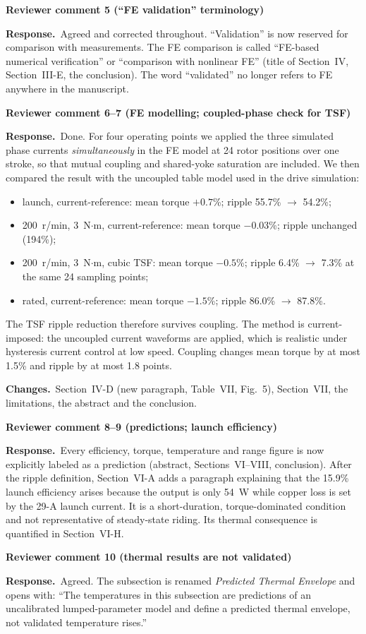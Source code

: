 \documentclass[10pt]{article}
\newcommand{\rev}[1]{\par\medskip\noindent\textbf{Reviewer comment #1}\par}
\newcommand{\resp}{\par\noindent\textcolor{blue!50!black}{\textbf{Response.}}~}
\newcommand{\chg}{\par\noindent\textcolor{green!35!black}{\textbf{Changes.}}~}
\begin{document}
\rev{5 (``FE validation'' terminology)}
\resp Agreed and corrected throughout. ``Validation'' is now reserved for
comparison with measurements. The FE comparison is called ``FE-based numerical
verification'' or ``comparison with nonlinear FE'' (title of Section~IV,
Section~III-E, the conclusion). The word ``validated'' no longer refers to FE
anywhere in the manuscript.

\rev{6--7 (FE modelling; coupled-phase check for TSF)}
\resp Done. For four operating points we applied the three simulated phase
currents \emph{simultaneously} in the FE model at 24 rotor positions over one
stroke, so that mutual coupling and shared-yoke saturation are included. We
then compared the result with the uncoupled table model used in the drive
simulation:
\begin{itemize}[nosep]
\item launch, current-reference: mean torque $+0.7$\%; ripple 55.7\%
$\rightarrow$ 54.2\%;
\item 200~r/min, 3~N$\cdot$m, current-reference: mean torque $-0.03$\%;
ripple unchanged (194\%);
\item 200~r/min, 3~N$\cdot$m, cubic TSF: mean torque $-0.5$\%; ripple 6.4\%
$\rightarrow$ 7.3\% at the same 24 sampling points;
\item rated, current-reference: mean torque $-1.5$\%; ripple 86.0\%
$\rightarrow$ 87.8\%.
\end{itemize}
The TSF ripple reduction therefore survives coupling. The method is
current-imposed: the uncoupled current waveforms are applied, which is
realistic under hysteresis current control at low speed.
Coupling changes mean torque by at most 1.5\% and ripple by at most 1.8
points.
\chg Section~IV-D (new paragraph, Table~VII, Fig.~5), Section~VII, the
limitations, the abstract and the conclusion.

\rev{8--9 (predictions; launch efficiency)}
\resp Every efficiency, torque, temperature and range figure is now explicitly
labeled as a prediction (abstract, Sections~VI--VIII, conclusion). After the
ripple definition, Section~VI-A adds a paragraph explaining that the 15.9\%
launch efficiency arises because the output is only 54~W while copper loss is
set by the 29-A launch current. It is a short-duration, torque-dominated
condition and not representative of steady-state riding. Its thermal
consequence is quantified in Section~VI-H.

\rev{10 (thermal results are not validated)}
\resp Agreed. The subsection is renamed \emph{Predicted Thermal Envelope} and
opens with: ``The temperatures in this subsection are predictions of an
uncalibrated lumped-parameter model and define a predicted thermal envelope,
not validated temperature rises.''
\end{document}
